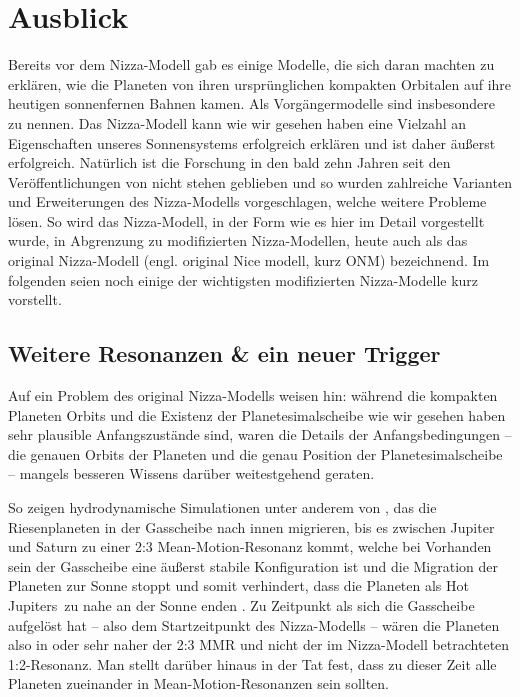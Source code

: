 \documentclass[12pt,a4paper,twoside,open=right,bibliography=totoc]{scrbook}
\renewcommand{\cite}{ \citep}
\begin{document}
\chapter{Ausblick}\label{erweiterungen}
Bereits vor dem Nizza-Modell gab es einige Modelle, die sich daran machten zu erklären, wie die Planeten von ihren ursprünglichen kompakten Orbitalen auf ihre heutigen sonnenfernen Bahnen kamen. Als Vorgängermodelle sind insbesondere \cite{Thommes1999,Thommes2003,Levison2004,Gomes2004} zu nennen.
Das Nizza-Modell kann wie wir gesehen haben eine Vielzahl an Eigenschaften unseres Sonnensystems erfolgreich erklären und ist daher äußerst erfolgreich.
Natürlich ist die Forschung in den bald zehn Jahren seit den Veröffentlichungen von \cite{Tsiganis2005,Morbidelli2005,Gomes2005} nicht stehen geblieben und so wurden zahlreiche Varianten und Erweiterungen des Nizza-Modells vorgeschlagen, welche weitere Probleme lösen.
So wird das Nizza-Modell, in der Form wie es hier im Detail vorgestellt wurde, in Abgrenzung zu modifizierten Nizza-Modellen, heute auch als das original Nizza-Modell (engl. \glqq original Nice modell\grqq, kurz ONM) bezeichnend.
Im folgenden seien noch einige der wichtigsten modifizierten Nizza-Modelle kurz vorstellt.

\section{Weitere Resonanzen \& ein neuer Trigger}\label{Nizza2}
Auf ein Problem des original Nizza-Modells weisen \cite{Morbidelli2007a} hin: während die kompakten Planeten Orbits und die Existenz der Planetesimalscheibe wie wir gesehen haben sehr plausible Anfangszustände sind, waren die Details der Anfangsbedingungen -- die genauen Orbits der Planeten und die genau Position der Planetesimalscheibe -- mangels besseren Wissens darüber weitestgehend geraten.

So zeigen hydrodynamische Simulationen unter anderem von \cite{Morbidelli2007a}, das die Riesenplaneten in der Gasscheibe nach innen migrieren, bis es zwischen Jupiter und Saturn zu einer 2:3 Mean-Motion-Resonanz kommt, welche bei Vorhanden sein der Gasscheibe eine äußerst stabile Konfiguration ist und die Migration der Planeten zur Sonne stoppt und somit verhindert, dass die Planeten als \glqq Hot Jupiters\grqq\ zu nahe an der Sonne enden\cite{Morbidelli2007a}.
Zu Zeitpunkt als sich die Gasscheibe aufgelöst hat -- also dem Startzeitpunkt des Nizza-Modells -- wären die Planeten also in oder sehr naher der 2:3 MMR und nicht der im Nizza-Modell betrachteten 1:2-Resonanz.
Man stellt darüber hinaus in der Tat fest, dass zu dieser Zeit alle Planeten zueinander in Mean-Motion-Resonanzen sein sollten.
\end{document}
